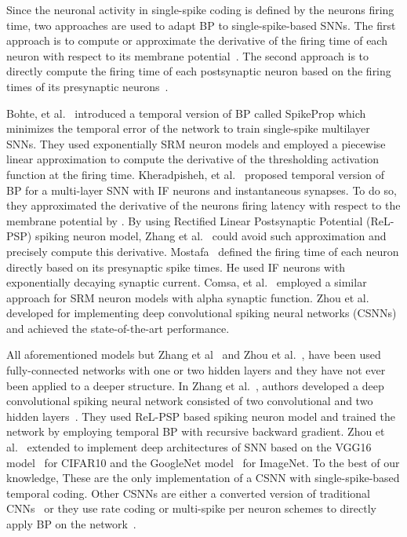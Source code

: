 \documentclass[preprint,twocolumn,5p,12pt]{article}
\begin{document}
Since the neuronal activity in single-spike coding is defined by the neurons firing time, two approaches are used to adapt BP to single-spike-based SNNs. The first approach is to compute or approximate the derivative of the firing time of each neuron with respect to its membrane potential~\cite{R7, R10, R18}. The second approach is to directly compute the firing time of each postsynaptic neuron based on the firing times of its presynaptic neurons~\cite{R8, R9, S1}.


Bohte, et al.~\cite{R7} introduced a temporal version of BP called SpikeProp which minimizes the temporal error of the network to train single-spike multilayer SNNs. They used exponentially SRM neuron models and employed a piecewise linear approximation to compute the derivative of the thresholding activation function at the firing time.
Kheradpisheh, et al.~\cite{R10} proposed temporal version of BP for a multi-layer SNN  with IF neurons and instantaneous synapses. To do so, they approximated the derivative of the neurons firing latency with respect to the  membrane potential by . By using  Rectified Linear Postsynaptic Potential (ReL-PSP) spiking neuron model, Zhang et al.~\cite{R18} could avoid such approximation and precisely compute this derivative. Mostafa~\cite{R8} defined the firing time of each neuron directly based on its presynaptic spike times. He used IF neurons with exponentially
decaying synaptic current.  Comsa, et al.~\cite{R9} employed a similar approach for SRM neuron models with alpha synaptic function. 
Zhou et al.~\cite{S1} developed \cite{R8} for implementing deep convolutional spiking neural networks (CSNNs) and achieved the state-of-the-art performance.

All aforementioned models but Zhang et al~\cite{R18} and Zhou et al.~\cite{S1}, have been used fully-connected networks with one or two hidden layers and they have not ever been applied to a deeper structure. In Zhang et al.~\cite{R18}, authors developed a deep convolutional spiking neural network consisted of two convolutional and two hidden layers~\cite{R18}. They used ReL-PSP based spiking neuron model and trained the network by employing temporal BP with recursive backward gradient. 
Zhou et al.~\cite{S1} extended \cite{R8} to implement deep architectures of SNN based on the VGG16 model~\cite{S2,S3} for CIFAR10 and the GoogleNet model~\cite{S4} for ImageNet.
To the best of our knowledge, These are the only implementation of a CSNN  with single-spike-based temporal coding. Other CSNNs are either a converted version of traditional CNNs~\cite{R4, R5, R6, R46} or they use rate coding or multi-spike per neuron schemes to directly apply BP on the network~\cite{R11,R12,R13}.
\end{document}
